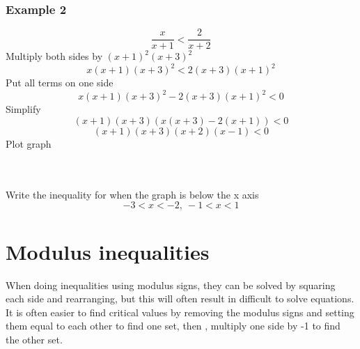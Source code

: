 \documentclass{article}[18pt]
\begin{document}
\subsubsection{Example 2}
$$\frac{x}{x+1}<\frac{2}{x+2}$$
Multiply both sides by $(x+1)^2(x+3)^2$
$$x(x+1)(x+3)^2<2(x+3)(x+1)^2$$
Put all terms on one side
$$x(x+1)(x+3)^2-2(x+3)(x+1)^2<0$$
Simplify
$$(x+1)(x+3)(x(x+3)-2(x+1))<0$$
$$(x+1)(x+3)(x+2)(x-1)<0$$
Plot graph\\
\\
\\
Write the inequality for when the graph is below the x axis
$$-3<x<-2, \ -1<x<1$$
\section{Modulus inequalities}
When doing inequalities using modulus signs, they can be solved by squaring each side and rearranging, but this will often result in difficult to solve equations.\\
It is often easier to find critical values by removing the modulus signs and setting them equal to each other to find one set, then , multiply one side by -1 to find the other set. 
\end{document}
